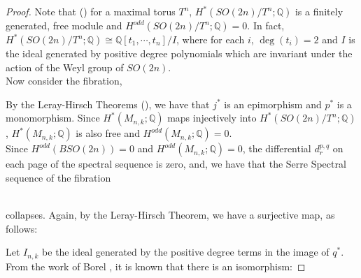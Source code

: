 \documentclass[a4paper,leqno,12pt]{amsart}
\theoremstyle{plain}
\theoremstyle{definition}
\theoremstyle{remark}
\newcommand{\Q}{\mathbb{Q}}
\begin{document}
{\begin{proof}
\noindent
Note that (\cite{MMT}) for a maximal torus $T^{n}$,  $H^{*}(SO(2n)/T^{n} ; \Q)$  is a finitely generated,  free module and $H^{odd}(SO(2n)/T^{n} ; \Q)=0 $.  In fact,  $H^{*}(SO(2n)/T^{n} ; \Q) \cong \Q[t_{1}, \cdots ,  t_{n}]/I $,  where for each $i$,  $\deg(t_i) =2$ and $I$ is the ideal generated by positive degree polynomials which are invariant under the action of the Weyl group of $SO(2n)$.  \\
 
 \noindent
Now consider the fibration,  \\

\noindent
By the Leray-Hirsch Theorems (\cite{MMT}),  we have that $j^{*}$ is an epimorphism and $p^{*}$ is a monomorphism.  Since $H^{*}(M_{n,k} ;\Q)$  maps injectively into $H^{*}(SO(2n)/ T^{n} ; \Q)$ , $H^{*}( M_{n,k} ; \Q)$ is also free and  $H^{odd} (M_{n,k} ; \Q) = 0$. \\

\noindent
Since $H^{odd} (BSO(2n)) = 0$ and $H^{odd} (M_{n,k} ; \Q) = 0$,  the differential $d_{r}^{p,q}$ on each page of the spectral sequence is zero,  and, we have that the Serre Spectral sequence of the fibration 

\\
 collapses.  Again,  by the Leray-Hirsch Theorem,  we have a surjective map,  as follows: 


\noindent
Let $I_{n,k}$ be the ideal generated by the positive degree terms in the image of $q^{*}$.  From the work of Borel \cite{bor},  it is known that there is an isomorphism:



\end{proof}}
\end{document}
